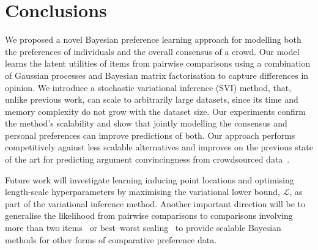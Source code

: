 \section{Conclusions}\label{sec:conclusion}

We proposed a novel Bayesian preference learning approach 
for modelling both the preferences of individuals 
and the overall consensus of a crowd. 
Our model learns the latent utilities of items from pairwise comparisons 
using a combination of Gaussian processes and Bayesian matrix factorisation 
to capture differences in  opinion.
We introduce a stochastic variational inference (SVI) method, that, 
unlike previous work, can scale to arbitrarily large datasets,
since its time and memory complexity do not grow with the dataset size.
Our experiments confirm the method's scalability and
 show that jointly modelling the consensus and personal
preferences can improve predictions of both.
Our approach performs competitively
against less scalable alternatives
and improves on 
the previous state of the art
for predicting argument convincingness from crowdsourced data~\citep{simpson2018finding}.

Future work will investigate learning inducing point locations and
optimising length-scale hyperparameters by maximising 
the variational lower bound, $\mathcal L$,
 as part of the variational inference method.
Another important direction will be to generalise the likelihood from pairwise comparisons
to comparisons involving more than two items~\citep{pan2018stagewise}
or best--worst scaling~\citep{kiritchenko2017best}
to provide scalable Bayesian methods for other forms of comparative preference data.
